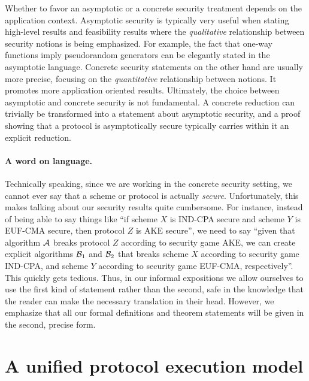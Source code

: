 Whether to favor an asymptotic or a concrete security treatment depends on the application context.
Asymptotic security is typically very useful when stating high-level results and feasibility results
where the \emph{qualitative} relationship between security notions is being emphasized.
For example, the fact that one-way functions imply pseudorandom generators can be elegantly stated in the asymptotic language.
Concrete security statements on the other hand are usually more precise,
focusing on the \emph{quantitative} relationship between notions.
It promotes more application oriented results.
Ultimately,
the choice between asymptotic and concrete security is not fundamental.
A concrete reduction can trivially be transformed into a statement about asymptotic security,
and a proof showing that a protocol is asymptotically secure typically carries within it an explicit reduction. 

\paragraph{A word on language.}
Technically speaking,
since we are working in the concrete security setting,
we cannot ever say that a scheme or protocol is actually \emph{secure}.
Unfortunately,
this makes talking about our security results quite cumbersome.
For instance, instead of being able to say things like
``if scheme $X$ is IND-CPA secure and scheme $Y$ is EUF-CMA secure,
then protocol $Z$ is AKE secure'',
we need to say
``given that algorithm $\A$ breaks protocol $Z$ according to security game AKE,
we can create explicit algorithms $\A[B]_1$ and $\A[B]_2$ that breaks scheme $X$ according to security game IND-CPA,
and scheme $Y$ according to security game EUF-CMA,
respectively''.
This quickly gets tedious.
Thus,
in our informal expositions we allow ourselves to use the first kind of statement rather than the second,
safe in the knowledge that the reader can make the necessary translation in their head.
However,
we emphasize that all our formal definitions and theorem statements will be given in the second,
precise form.







\section{A unified protocol execution model}\label{sec:definitions:unified}

